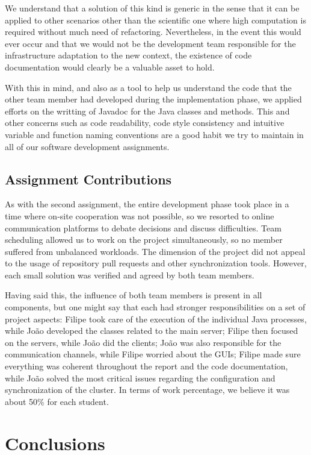 \documentclass[12pt]{article}
\begin{document}
We understand that a solution of this kind is generic in the sense that it can be applied to other scenarios other than the scientific one where high computation
is required without much need of refactoring.
Nevertheless, in the event this would ever occur and that we would not be the development team responsible for the infrastructure adaptation to the new context,
the existence of code documentation would clearly be a valuable asset to hold.

With this in mind, and also as a tool to help us understand the code that the other team member had developed during the implementation phase, we applied efforts
on the writting of Javadoc for the Java classes and methods.
This and other concerns such as code readability, code style consistency and intuitive variable and function naming conventions are a good habit we try to maintain
in all of our software development assignments.

\subsection{Assignment Contributions} \label{contributions} %

As with the second assignment, the entire development phase took place in a time where on-site cooperation was not possible, so we resorted to online 
communication platforms to debate decisions and discuss difficulties.
Team scheduling allowed us to work on the project simultaneously, so no member suffered from unbalanced workloads.
The dimension of the project did not appeal to the usage of repository pull requests and other synchronization tools.
However, each small solution was verified and agreed by both team members.

Having said this, the influence of both team members is present in all components, but one might say that each had stronger responsibilities on a set of project aspects:
Filipe took care of the execution of the individual Java processes, while João developed the classes related to the main server; 
Filipe then focused on the servers, while João did the clients;
João was also responsible for the communication channels, while Filipe worried about the GUIs;
Filipe made sure everything was coherent throughout the report and the code
documentation, while João solved the most critical issues regarding the configuration and synchronization of the cluster.
In terms of work percentage, we believe it was about 50\% for each student.

\newpage
\section*{Conclusions} \label{conclusions} %
\end{document}
